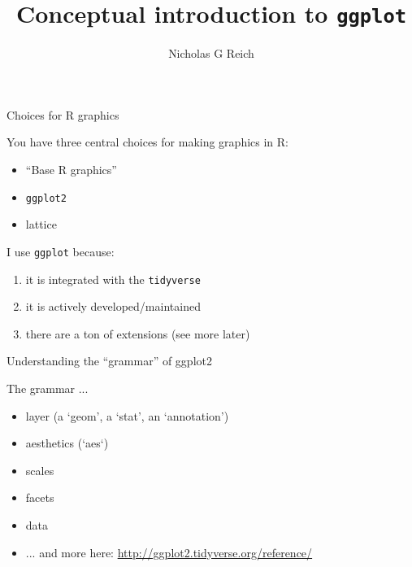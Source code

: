 \documentclass[table]{beamer}\usepackage[]{graphicx}\usepackage[]{color}
\title{Conceptual introduction to \tt ggplot}
\author{Nicholas G Reich}
\begin{document}
\begin{frame}[plain]
	\titlepage
\end{frame}





\begin{frame}{Choices for R graphics}

You have three central choices for making graphics in R:

\begin{itemize}
    \item ``Base R graphics''
    \item {\tt ggplot2}
    \item lattice
\end{itemize}

\vspace{2em}

I use {\tt ggplot} because:
\begin{enumerate}
    \item it is integrated with the {\tt tidyverse}
    \item it is actively developed/maintained
    \item there are a ton of extensions (see more later)
\end{enumerate}


\end{frame}



\begin{frame}[fragile]{Understanding the ``grammar'' of ggplot2}

The grammar ...

\begin{itemize}
    \item layer (a `geom', a `stat', an `annotation') 
    \item aesthetics (`aes`)
    \item scales
    \item facets
    \item data
    \item ... and more here: \href{http://ggplot2.tidyverse.org/reference/}{http://ggplot2.tidyverse.org/reference/}
\end{itemize}

\end{frame}
\end{document}
